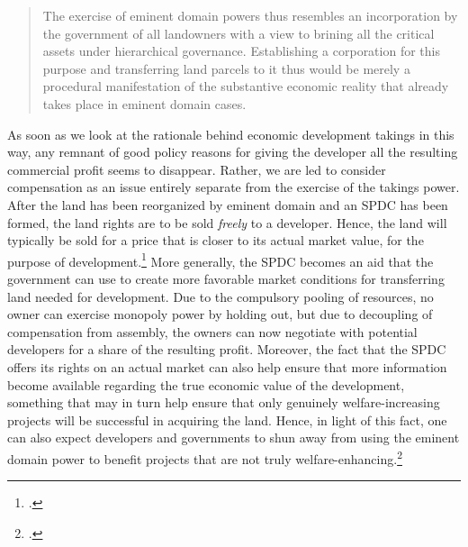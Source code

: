 \begin{quote}
The exercise of eminent domain powers thus resembles an incorporation by the government of all landowners with a view to brining all the critical assets under hierarchical governance. Establishing a corporation for this purpose and transferring land parcels to it thus would be merely a procedural manifestation of the substantive economic reality that already takes place in eminent domain cases.
\end{quote}

As soon as we look at the rationale behind economic development takings in this way, any remnant of good policy reasons for giving the developer all the resulting commercial profit seems to disappear. Rather, we are led to consider compensation as an issue entirely separate from the exercise of the takings power. After the land has been reorganized by eminent domain and an SPDC has been formed, the land rights are to be sold {\it freely} to a developer. Hence, the land will typically be sold for a price that is closer to its actual market value, for the purpose of development.\footcite[1735-1736]{lehavi07} More generally, the SPDC becomes an aid that the government can use to create more favorable market conditions for transferring land needed for development. Due to the compulsory pooling of resources, no owner can exercise monopoly power by holding out, but due to decoupling of compensation from assembly, the owners can now negotiate with potential developers for a share of the resulting profit. Moreover, the fact that the SPDC offers its rights on an actual market can also help ensure that more information become available regarding the true economic value of the development, something that may in turn help ensure that only genuinely welfare-increasing projects will be successful in acquiring the land. Hence, in light of this fact, one can also expect developers and governments to shun away from using the eminent domain power to benefit projects that are not truly welfare-enhancing.\footcite[1735-1736]{lehavi07}

